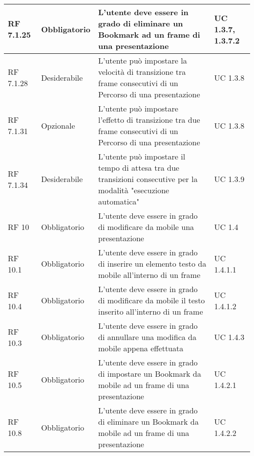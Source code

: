 {\begin{longtable} [c]{| p{2.5cm} | p{2.5cm} | p{6cm} |p{2.5cm}|}
		\hline
		RF 7.1.25 & Obbligatorio & L'utente deve essere in grado di eliminare un Bookmark\ped{g} ad un frame\ped{g} di una presentazione & UC 1.3.7, 1.3.7.2\\
		\hline
		RF 7.1.28 & Desiderabile & L'utente può impostare la velocità di transizione tra frame\ped{g} consecutivi di un Percorso\ped{g} di una presentazione & UC 1.3.8\\
		\hline
		RF 7.1.31 & Opzionale & L'utente può impostare l’effetto di transizione tra due frame\ped{g} consecutivi di un Percorso\ped{g} di una presentazione & UC 1.3.8\\
		\hline
		RF 7.1.34 & Desiderabile & L'utente può impostare il tempo di attesa tra due transizioni consecutive per la modalità "esecuzione automatica" & UC 1.3.9\\
		\hline
		RF 10 & Obbligatorio & L'utente deve essere in grado di modificare da mobile una presentazione & UC 1.4\\
		\hline
		RF 10.1 & Obbligatorio & L'utente deve essere in grado di inserire un elemento testo da mobile all'interno di un frame\ped{g} & UC 1.4.1.1\\
		\hline
		RF 10.4 & Obbligatorio & L'utente deve essere in grado di modificare da mobile il testo inserito all'interno di un frame\ped{g} & UC 1.4.1.2\\
		\hline
		RF 10.3 & Obbligatorio & L'utente deve essere in grado di annullare una modifica da mobile appena effettuata & UC 1.4.3\\
		\hline
		RF 10.5 & Obbligatorio & L'utente deve essere in grado di impostare un Bookmark\ped{g} da mobile ad un frame\ped{g} di una presentazione & UC 1.4.2.1\\
		\hline
		RF 10.8 & Obbligatorio & L'utente deve essere in grado di eliminare un Bookmark\ped{g} da mobile ad un frame\ped{g} di una presentazione & UC 1.4.2.2\\
		

\end{longtable}}
